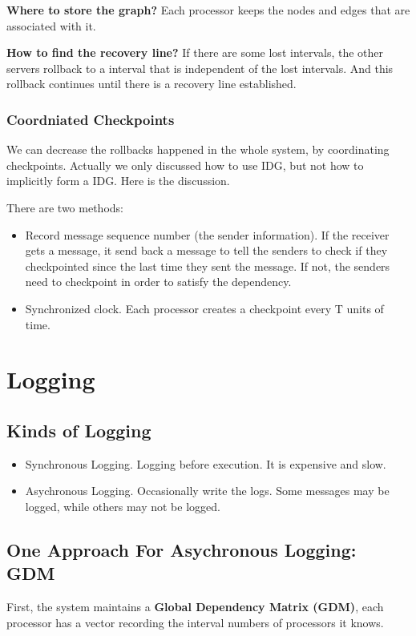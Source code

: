 \textbf{Where to store the graph?} Each processor keeps the nodes and edges that are associated with it.

\textbf{How to find the recovery line?} If there are some lost intervals, the other servers rollback to a interval that is independent of the lost intervals. And this rollback continues until there is a recovery line established.

\subsubsection{Coordniated Checkpoints}
We can decrease the rollbacks happened in the whole system, by coordinating checkpoints. Actually we only discussed how to use IDG, but not how to implicitly form a IDG. Here is the discussion.

There are two methods:
\begin{itemize}
    \item Record message sequence number (the sender information). If the receiver gets a message, it send back a message to tell the senders to check if they checkpointed since the last time they sent the message. If not, the senders need to checkpoint in order to satisfy the dependency.
    \item Synchronized clock. Each processor creates a checkpoint every T units of time.
\end{itemize}

\section{Logging}

\subsection{Kinds of Logging}

\begin{itemize}
    \item Synchronous Logging. Logging before execution. It is expensive and slow.
    \item Asychronous Logging. Occasionally write the logs. Some messages may be logged, while others may not be logged.
\end{itemize}

\subsection{One Approach For Asychronous Logging: GDM}
First, the system maintains a \textbf{Global Dependency Matrix (GDM)}, each processor has a vector recording the interval numbers of processors it knows. 

